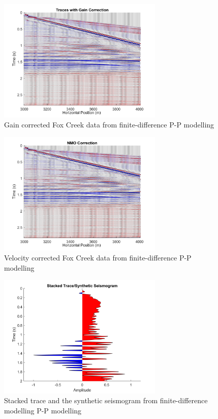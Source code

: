\documentclass[12pt]{article}
\begin{document}
\begin{figure}[!htb]
	\centering
	\includegraphics[width=0.7\textwidth]{Figures/FDCgainPP.png}
	\caption[Fox Creek finite-difference P-P gain correction]{Gain corrected Fox Creek data from finite-difference P-P modelling}
	\label{fig:FDCgainPP}
\end{figure}	

\begin{figure}[!htb]
	\centering
	\includegraphics[width=0.7\textwidth]{Figures/FDCnmoPP.png}
	\caption[Fox Creek finite-difference P-P NMO correction]{Velocity corrected Fox Creek data from finite-difference P-P modelling}
	\label{fig:FDCnmoPP}
\end{figure}	

\begin{figure}[!htb]
	\centering
	\includegraphics[width=0.7\textwidth]{Figures/FDCstackPP.png}
	\caption[Fox Creek finite-difference P-P synthetic seismogram]{Stacked trace and the synthetic seismogram from finite-difference modelling P-P modelling}
	\label{fig:FDCstackPP}
\end{figure}
\end{document}
